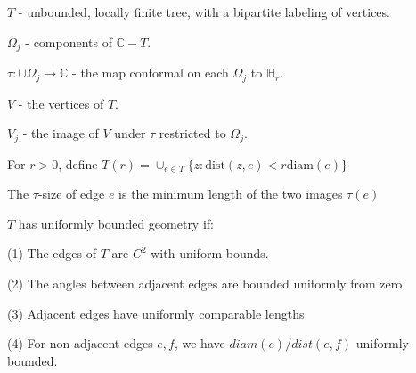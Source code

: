 \documentclass{beamer}
\begin{document}
\begin{frame}

$T$ - unbounded, locally finite tree, with a bipartite labeling of vertices.

$\Omega_j$ - components of $\mathbb{C}-T$.

$\tau: \cup \Omega_j \rightarrow \mathbb{C}$ - the map conformal on each $\Omega_j$ to $\mathbb{H}_r$.

$V$ - the vertices of $T$. 

$V_j$ - the image of $V$ under $\tau$ restricted to $\Omega_j$.

For $r > 0$, define $T(r) = \cup_{e\in T} \{z : \textrm{dist}(z,e) < r\textrm{diam}(e) \}$

The $\tau$-size of edge $e$ is the minimum length of the two images $\tau(e)$

\vspace{5mm}

$T$ has uniformly bounded geometry if: 

\hspace{5mm} (1) The edges of $T$ are $C^2$ with uniform bounds. 

\hspace{5mm} (2) The angles between adjacent edges are bounded uniformly from zero

\hspace{5mm} (3) Adjacent edges have uniformly comparable lengths

\hspace{5mm} (4) For non-adjacent edges $e, f$, we have $diam(e)/dist(e,f)$ uniformly bounded.

\end{frame}
\end{document}
